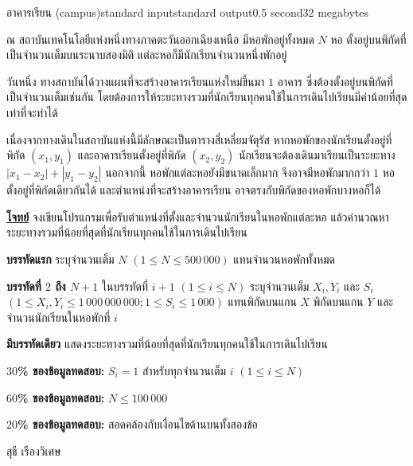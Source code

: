 \documentclass[11pt,a4paper]{article}
\begin{document}
\begin{problem}{อาคารเรียน (campus)}{standard input}{standard output}{0.5 second}{32 megabytes}

ณ สถาบันเทคโนโลยีแห่งหนึ่งทางภาคตะวันออกเฉียงเหนือ มีหอพักอยู่ทั้งหมด $N$ หอ ตั้งอยู่บนพิกัดที่เป็นจำนวนเต็มบนระนาบสองมิติ แต่ละหอก็มีนักเรียนจำนวนหนึ่งพักอยู่

วันหนึ่ง ทางสถาบันได้วางแผนที่จะสร้างอาคารเรียนแห่งใหม่ขึ้นมา $1$ อาคาร ซึ่งต้องตั้งอยู่บนพิกัดที่เป็นจำนวนเต็มเช่นกัน โดยต้องการให้ระยะทางรวมที่นักเรียนทุกคนใช้ในการเดินไปเรียนมีค่าน้อยที่สุดเท่าที่จะทำได้

เนื่องจากทางเดินในสถาบันแห่งนี้มีลักษณะเป็นตารางสี่เหลี่ยมจัตุรัส หากหอพักของนักเรียนตั้งอยู่ที่พิกัด $(x_1, y_1)$ และอาคารเรียนตั้งอยู่ที่พิกัด $(x_2, y_2)$ นักเรียนจะต้องเดินมาเรียนเป็นระยะทาง $|x_1 - x_2| + |y_1 - y_2|$ นอกจากนี้ หอพักแต่ละหอยังมีขนาดเล็กมาก จึงอาจมีหอพักมากกว่า $1$ หอ ตั้งอยู่ที่พิกัดเดียวกันได้ และตำแหน่งที่จะสร้างอาคารเรียน อาจตรงกับพิกัดของหอพักบางหอก็ได้

\bigskip
\underline{\textbf{โจทย์}}  จงเขียนโปรแกรมเพื่อรับตำแหน่งที่ตั้งและจำนวนนักเรียนในหอพักแต่ละหอ แล้วคำนวณหาระยะทางรวมที่น้อยที่สุดที่นักเรียนทุกคนใช้ในการเดินไปเรียน


\InputFile

\textbf{บรรทัดแรก} ระบุจำนวนเต็ม $N$ $(1 \leq N \leq 500\,000)$ แทนจำนวนหอพักทั้งหมด

\textbf{บรรทัดที่ $2$ ถึง $N+1$} ในบรรทัดที่ $i+1$ $(1 \leq i \leq N)$ ระบุจำนวนเต็ม $X_i, Y_i$ และ $S_i$ $(1 \leq X_i,Y_i \leq 1\,000\,000\,000; 1 \leq S_i \leq 1\,000)$ แทนพิกัดบนแกน $X$ พิกัดบนแกน $Y$ และจำนวนนักเรียนในหอพักที่ $i$


\OutputFile

\textbf{มีบรรทัดเดียว} แสดงระยะทางรวมที่น้อยที่สุดที่นักเรียนทุกคนใช้ในการเดินไปเรียน

\Examples

\begin{example}
%
%
\end{example}

\Scoring

\textbf{$30$\% ของข้อมูลทดสอบ:} $S_i = 1$ สำหรับทุกจำนวนเต็ม $i$  $(1 \leq i \leq N )$

\textbf{$60$\% ของข้อมูลทดสอบ:} $N \leq 100\,000$

\textbf{$20$\% ของข้อมูลทดสอบ:} สอดคล้องกับเงื่อนไขด้านบนทั้งสองข้อ

\Source

สุธี เรืองวิเศษ

\end{problem}
\end{document}
